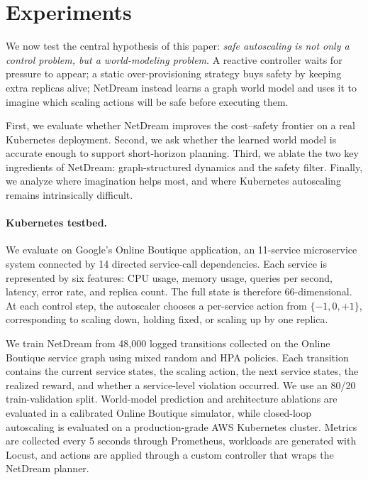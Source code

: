\section{Experiments}
\label{sec:experiments}

We now test the central hypothesis of this paper: \emph{safe autoscaling
is not only a control problem, but a world-modeling problem}. A reactive
controller waits for pressure to appear; a static over-provisioning
strategy buys safety by keeping extra replicas alive; NetDream instead
learns a graph world model and uses it to imagine which scaling actions
will be safe before executing them.

First, we evaluate whether NetDream improves the cost--safety frontier
on a real Kubernetes deployment. Second, we ask whether the learned world model is accurate
enough to support short-horizon planning. Third, we ablate the two key
ingredients of NetDream: graph-structured dynamics and the safety filter.
Finally, we analyze where imagination helps most, and where Kubernetes
autoscaling remains intrinsically difficult.

\paragraph{Kubernetes testbed.}
We evaluate on Google's Online Boutique application, an 11-service
microservice system connected by 14 directed service-call dependencies.
Each service is represented by six features: CPU usage, memory usage,
queries per second, latency, error rate, and replica count. The full
state is therefore 66-dimensional. At each control step, the autoscaler
chooses a per-service action from $\{-1,0,+1\}$, corresponding to
scaling down, holding fixed, or scaling up by one replica.

We train NetDream from 48{,}000 logged transitions collected on the
Online Boutique service graph using mixed random and HPA policies. Each
transition contains the current service states, the scaling action, the
next service states, the realized reward, and whether a service-level
violation occurred. We use an 80/20 train-validation split. World-model
prediction and architecture ablations are evaluated in a calibrated
Online Boutique simulator, while closed-loop autoscaling is evaluated on
a production-grade AWS Kubernetes cluster. Metrics are collected every
5 seconds through Prometheus, workloads are generated with Locust, and
actions are applied through a custom controller that wraps the NetDream
planner.

